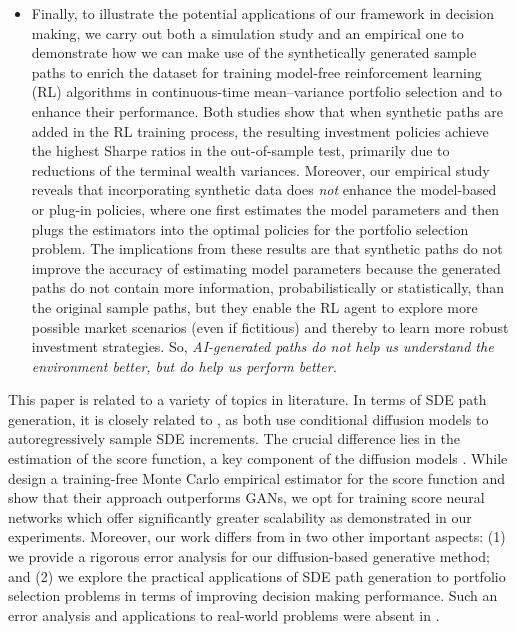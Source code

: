 \documentclass[11pt]{article}
\begin{document}
\begin{itemize}
\item Finally, to illustrate the potential applications of our framework in decision making, we carry out both a simulation study and an empirical one to demonstrate how we can make use of the synthetically generated sample paths
to enrich the dataset for training model-free reinforcement learning (RL) algorithms in continuous-time mean--variance portfolio selection \citep{ jia2023q} and to enhance their performance. Both studies show that
when synthetic paths are added in the RL training process, the resulting investment policies achieve the highest Sharpe ratios in the out-of-sample test, primarily due to reductions of the terminal wealth variances.  Moreover,
 our empirical study reveals that incorporating synthetic data does {\it not} enhance the model-based or plug-in policies, where one first estimates the model parameters and then plugs the estimators into the optimal policies for the portfolio selection problem. The implications from these results are that synthetic paths do not improve the accuracy of estimating model parameters because the generated paths do not contain more information, probabilistically or statistically, than the original sample paths, but they enable the RL agent to explore more possible market scenarios (even if fictitious) and thereby to learn more robust investment strategies. So, {\it AI-generated paths do not help us understand the environment better, but do help us perform better.}

\end{itemize}








This paper is related to a variety of topics in literature.
In terms of SDE path generation, it is closely related to \cite{liu2025training}, as both use conditional diffusion models to autoregressively sample SDE increments.
The crucial difference lies in the estimation of the score function, a key component of the diffusion models \citep{ho2020denoising, songscore}. While \cite{liu2025training} design a training-free Monte Carlo empirical estimator for the score
function and show that their approach outperforms GANs, we opt for training score neural networks which offer significantly greater scalability as demonstrated in our experiments. Moreover, our work differs from \cite{liu2025training} in two other important aspects: (1) we provide a rigorous error analysis for our diffusion-based generative method; and (2) we explore the practical applications of SDE path generation to portfolio selection problems in terms of improving decision making performance. Such an error analysis and applications to real-world problems were absent in \cite{liu2025training}.
\end{document}
